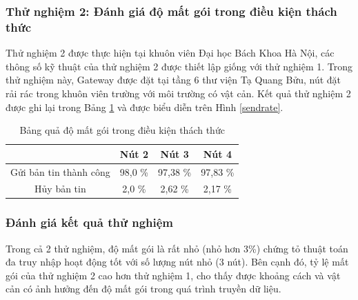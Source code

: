 \subsubsection{Thử nghiệm 2: Đánh giá độ mất gói trong điều kiện thách thức}
Thử nghiệm 2 được thực hiện tại khuôn viên Đại học Bách Khoa Hà Nội, các thông số kỹ thuật của thử nghiệm 2 được thiết lập giống với thử nghiệm 1. Trong thử nghiệm này, Gateway được đặt tại tầng 6 thư viện Tạ Quang Bửu, nút đặt rải rác trong khuôn viên trường với môi trường có vật cản. Kết quả thử nghiệm 2 được ghi lại trong Bảng \ref{TN2} và được biểu diễn trên Hình \ref{sendrate}{}.\\
\begin{table}[h]
\centering
\caption{Bảng quả độ mất gói trong điều kiện thách thức}
\label{TN2}
\begin{tabular}{|c|c|c|c|}
\hline
 & Nút 2 & Nút 3 & Nút 4 \\
 \hline
 Gửi bản tin thành công & 98,0 \% & 97,38 \% & 97,83 \% \\
 \hline
 Hủy bản tin & 2,0 \% & 2,62 \% & 2,17 \% \\
 \hline
\end{tabular}
\end{table}
\subsubsection{Đánh giá kết quả thử nghiệm}
Trong cả 2 thử nghiệm, độ mất gói là rất nhỏ (nhỏ hơn 3\%) chứng tỏ thuật toán đa truy nhập hoạt động tốt với số lượng nút nhỏ (3 nút). Bên cạnh đó, tỷ lệ mất gói của thử nghiệm 2 cao hơn thử nghiệm 1, cho thấy được khoảng cách và vật cản có ảnh hưởng đến độ mất gói trong quá trình truyền dữ liệu.
